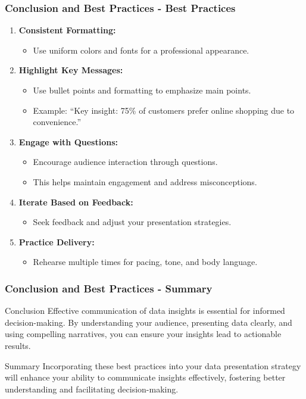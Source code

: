 \documentclass{beamer}
\begin{document}
\begin{frame}[fragile]
    \frametitle{Conclusion and Best Practices - Best Practices}
    \begin{enumerate}
        \item \textbf{Consistent Formatting:}
        \begin{itemize}
            \item Use uniform colors and fonts for a professional appearance.
        \end{itemize}
        
        \item \textbf{Highlight Key Messages:}
        \begin{itemize}
            \item Use bullet points and formatting to emphasize main points.
            \item Example: ``Key insight: 75\% of customers prefer online shopping due to convenience.''
        \end{itemize}
        
        \item \textbf{Engage with Questions:}
        \begin{itemize}
            \item Encourage audience interaction through questions.
            \item This helps maintain engagement and address misconceptions.
        \end{itemize}
        
        \item \textbf{Iterate Based on Feedback:}
        \begin{itemize}
            \item Seek feedback and adjust your presentation strategies.
        \end{itemize}
        
        \item \textbf{Practice Delivery:}
        \begin{itemize}
            \item Rehearse multiple times for pacing, tone, and body language.
        \end{itemize}
    \end{enumerate}
\end{frame}

\begin{frame}[fragile]
    \frametitle{Conclusion and Best Practices - Summary}
    \begin{block}{Conclusion}
        Effective communication of data insights is essential for informed decision-making. By understanding your audience, presenting data clearly, and using compelling narratives, you can ensure your insights lead to actionable results.
    \end{block}
    
    \begin{block}{Summary}
        Incorporating these best practices into your data presentation strategy will enhance your ability to communicate insights effectively, fostering better understanding and facilitating decision-making.
    \end{block}
\end{frame}
\end{document}
